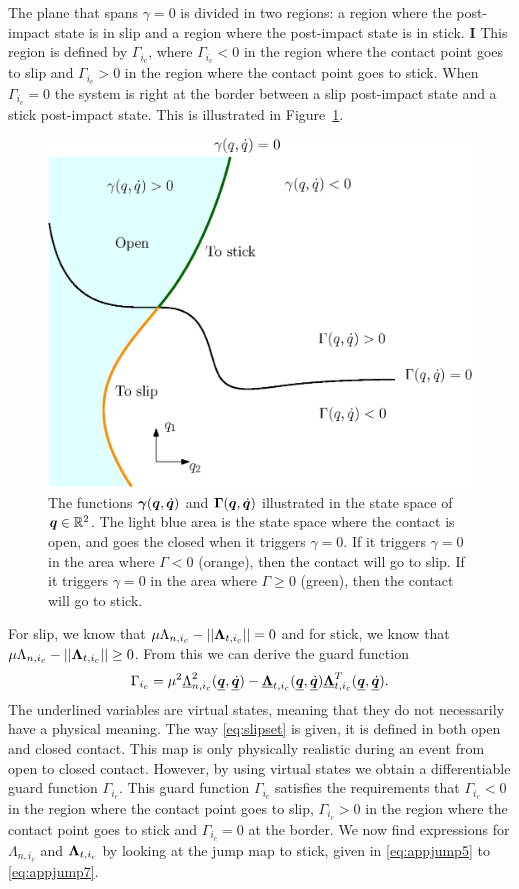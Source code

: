 \documentclass[../DC2017114Bouma.tex]{subfiles}
\begin{document}
The plane that spans $\gamma = 0$ is divided in two regions: a region where the post-impact state is in slip and a region where the post-impact state is in stick. $\boldsymbol{I}$ This region is defined by $\Gamma_{i_c}$, where $\Gamma_{i_c}<0$ in the region where the contact point goes to slip and $\Gamma_{i_c} > 0$ in the region where the contact point goes to stick. When $\Gamma_{i_c} = 0$ the system is right at the border between a slip post-impact state and a stick post-impact state. This is illustrated in Figure~\ref{fig:guardopcl}. 
\begin{figure}[H]
	\centering
	\includegraphics[width=.7\textwidth]{guardopcl.eps}\caption{The functions $\boldsymbol{\gamma}({\boldsymbol{q}},\dot{{\boldsymbol{q}}})$ and $\boldsymbol{\Gamma}({\boldsymbol{q}},\dot{{\boldsymbol{q}}})$ illustrated in the state space of ${\boldsymbol{q}}\in\mathbb{R}^{2}$. The light blue area is the state space where the contact is open, and goes the closed when it triggers $\gamma = 0$. If it triggers $\gamma = 0$ in the area where $\Gamma<0$ (orange), then the contact will go to slip. If it triggers $\gamma=0$ in the area where $\Gamma\geq 0$ (green), then the contact will go to stick.}\label{fig:guardopcl}
\end{figure}
For slip, we know that $\mu\Lambda_{n,i_c} - ||\boldsymbol{\Lambda}_{t,i_c}|| = 0$ and for stick, we know that  $\mu\Lambda_{n,i_c} - ||\boldsymbol{\Lambda}_{t,i_c}|| \geq 0$. From this we can derive the guard function
\begin{align}
\Gamma_{i_c} = \mu^2 \underline{\Lambda}_{n,i_c}^2(\underline{{\boldsymbol{q}}},\underline{\dot{{\boldsymbol{q}}}}) - \underline{\boldsymbol{\Lambda}}_{t,i_c}(\underline{{\boldsymbol{q}}},\underline{\dot{{\boldsymbol{q}}}})\underline{\boldsymbol{\Lambda}}_{t,i_c}^T(\underline{{\boldsymbol{q}}},\underline{\dot{{\boldsymbol{q}}}}). \label{eq:slipset}
\end{align}
The underlined variables are virtual states, meaning that they do not necessarily have a physical meaning. The way \eqref{eq:slipset} is given, it is defined in both open and closed contact. This map is only physically realistic during an event from open to closed contact. However, by using virtual states we obtain a differentiable guard function $\Gamma_{i_c}$. This guard function $\Gamma_{i_c}$ satisfies the requirements that $\Gamma_{i_c}<0$ in the region where the contact point goes to slip, $\Gamma_{i_c} > 0$ in the region where the contact point goes to stick and $\Gamma_{i_c} = 0$ at the border. We now find expressions for $\Lambda_{n,i_c}$ and $\boldsymbol{\Lambda}_{t,i_c}$ by looking at the jump map to stick, given in \eqref{eq:appjump5} to \eqref{eq:appjump7}.
\end{document}
